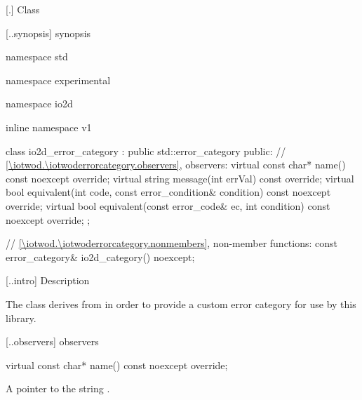  [\iotwod.\iotwoderrorcategory] {Class }

 [\iotwod.\iotwoderrorcategory.synopsis] { 
synopsis}

\begin{codeblock}
namespace std { namespace experimental { namespace io2d { inline namespace v1 {
  class io2d_error_category : public std::error_category {
  public:
    // \ref{\iotwod.\iotwoderrorcategory.observers}, observers:
    virtual const char* name() const noexcept override;
    virtual string message(int errVal) const override;
    virtual bool equivalent(int code,
      const error_condition& condition) const noexcept override;
    virtual bool equivalent(const error_code& ec,
      int condition) const noexcept override;
  };
  
  // \ref{\iotwod.\iotwoderrorcategory.nonmembers}, non-member functions:
  const error_category& io2d_category() noexcept;
} } } }
\end{codeblock}

 [\iotwod.\iotwoderrorcategory.intro] { 
Description}

\pnum
{}
The  class derives from 
 in order to provide a custom error category for 
use by this library.

 [\iotwod.\iotwoderrorcategory.observers] { 
observers}

\begin{itemdecl}
virtual const char* name() const noexcept override;
\end{itemdecl}
\begin{itemdescr}
	\pnum
	\returns
	A pointer to the string .
\end{itemdescr}

